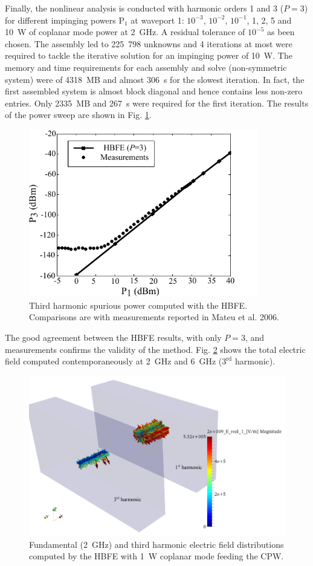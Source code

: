 Finally, the nonlinear analysis is conducted with harmonic orders 1 and 3 ($P=3$) for different impinging powers $\mathrm{P}_1$ at waveport 1: $10^{-3}$, $10^{-2}$, $10^{-1}$, 1, 2, 5 and 10~W of coplanar mode power at 2~GHz. A residual tolerance of $10^{-5}$ as been chosen. The assembly led to 225~798 unknowns and 4 iterations at most were required to tackle the iterative solution for an impinging power of 10~W. The memory and time requirements for each assembly and solve (non-symmetric system) were of 4318~MB and almost 306~s for the slowest iteration. In fact, the first assembled system is almost block diagonal and hence contains less non-zero entries. Only 2335~MB and 267~s were required for the first iteration. The results of the power sweep are shown in Fig. \ref{fig:P3}.
%
\begin{figure}[ht!]
\centering
\includegraphics[width=10cm]{P3}
\caption{Third harmonic spurious power computed with the HBFE. Comparisons are with measurements reported in Mateu et al. 2006.}
\label{fig:P3}
\end{figure}
%
The good agreement between the HBFE results, with only $P=3$, and measurements confirms the validity of the method. Fig. \ref{fig:FieldGlyph} shows the total electric field computed contemporaneously at 2~GHz and 6~GHz ($3^\mathrm{rd}$ harmonic).


\begin{figure}[ht!]
\centering
\includegraphics[width=13.4cm]{FieldGlyph}
\caption{Fundamental (2~GHz) and third harmonic electric field distributions computed  by the HBFE with 1~W coplanar mode feeding the CPW.}
\label{fig:FieldGlyph}
\end{figure}

